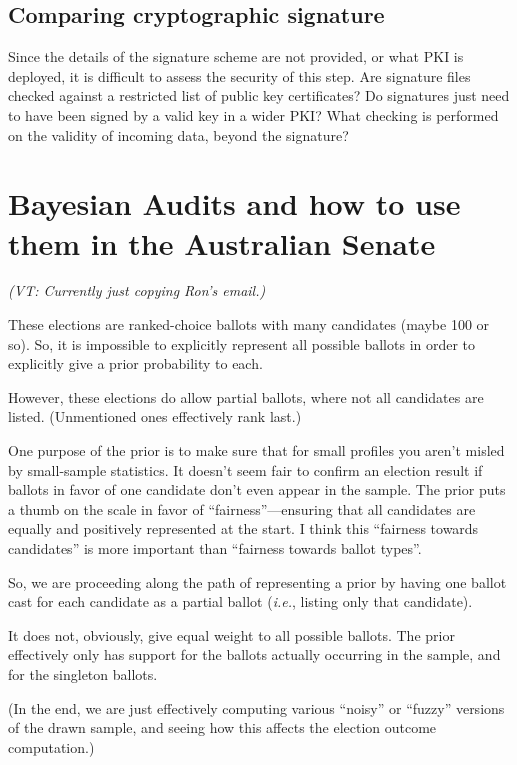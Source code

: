 \documentclass[10pt,a4paper]{article}
\newcommand{\VTNote}[1]{{\it(VT: #1)}}
\begin{document}
\subsection{Comparing cryptographic signature}
Since the details of the signature scheme are not provided, or what PKI is deployed, it is difficult to assess the security of this step. Are signature files checked against a restricted list of public key certificates? Do signatures just need to have been signed by a valid key in a wider PKI? What checking is performed on the validity of incoming data, beyond the signature?



\section{Bayesian Audits and how to use them in the Australian Senate}  \label{sec:bayes}
\VTNote{Currently just copying Ron's email.}

These elections are ranked-choice ballots with many candidates (maybe 100 or
so).  So, it is impossible to explicitly represent all possible ballots in
order to explicitly give a prior probability to each.  

However, these elections do allow partial ballots, where not
all candidates are listed. (Unmentioned ones effectively rank last.)

One purpose of the prior is to make sure that for small profiles you
aren't misled by small-sample statistics.  It doesn't seem fair
to confirm an election result if ballots in favor of one candidate don't
even appear in the sample.   The prior puts a thumb on the scale in
favor of ``fairness''---ensuring that all candidates are equally and
positively represented at the start.  I think this ``fairness towards
candidates'' is more important than ``fairness towards ballot types''.

So, we are proceeding along the path of representing a prior by
having one ballot cast for each candidate as a partial ballot ({\it i.e.},
listing only that candidate).  

It does not, obviously, give equal weight to all possible ballots.
The prior effectively only has support for the ballots actually 
occurring in the sample, and for the singleton ballots.  

(In the end, we are just effectively computing various ``noisy''
or ``fuzzy'' versions of the drawn sample, and seeing how this
affects the election outcome computation.)
\end{document}
